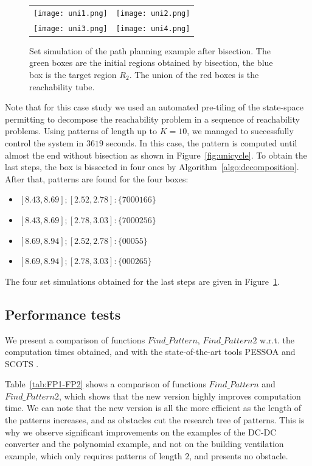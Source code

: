 \begin{figure}[t]
  \centering
  \begin{tabular}{cc}
    \texttt{[image: uni1.png]}
    &
    \texttt{[image: uni2.png]}
    \\
    \texttt{[image: uni3.png]}
    &
    \texttt{[image: uni4.png]}
  \end{tabular}
  \caption{Set simulation of the path planning example after
    bisection. The green boxes are the initial regions obtained by
    bisection, the blue box is the target region $R_2$. The union of
    the red boxes is the reachability tube.}
  \label{fig:unicycle2}
\end{figure}


Note that for this case study we used an automated pre-tiling of the
state-space permitting to decompose the reachability problem in a
sequence of reachability problems.  Using patterns of length up to
$K=10$, we managed to successfully control the system in $3619$
seconds. In this case, the pattern is computed until almost the end
without bisection as shown in Figure~\ref{fig:unicycle}. To obtain the
last steps, the box is bissected in four ones by
Algorithm~\ref{algo:decomposition}. After that, patterns are found for
the four boxes:
\begin{itemize}
 \item $[8.43, 8.69] ; [2.52, 2.78] : \{7 0 0 0 1 6 6 \}$
 \item $[8.43, 8.69] ; [2.78, 3.03] : \{7 0 0 0 2 5 6 \}$
 \item $[8.69, 8.94] ; [2.52, 2.78] : \{0 0 0 5 5 \}$
 \item $[8.69, 8.94] ; [2.78, 3.03] : \{0 0 0 2 6 5 \}$
\end{itemize}

The four set simulations obtained for the last steps are given in
Figure~\ref{fig:unicycle2}.


\subsection{Performance tests}
\label{sec:comparison}

We present a comparison of functions $Find\_Pattern$, $Find\_Pattern2$
w.r.t. the computation times obtained, and with the state-of-the-art
tools PESSOA \cite{Mazo2010} and SCOTS \cite{SCOTS}.


Table~\ref{tab:FP1-FP2} shows a comparison of functions
$Find\_Pattern$ and $Find\_Pattern2$, which shows that the new version
highly improves computation time.  We can note that the new
version is all the more efficient as the length of the patterns
increases, and as obstacles cut the research tree of patterns. This is
why we observe significant improvements on the examples of the DC-DC
converter and the polynomial example, and not on the building
ventilation example, which only requires patterns of length $2$, and
presents no obstacle.

